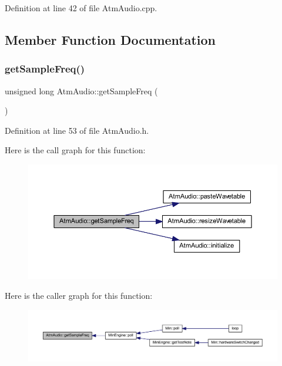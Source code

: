 Definition at line 42 of file Atm\+Audio.\+cpp.



\subsection{Member Function Documentation}
\mbox{\label{class_atm_audio_a9336911a6a8dd22d4030b0457270c242}} 
\subsubsection{\texorpdfstring{get\+Sample\+Freq()}{getSampleFreq()}}
{\footnotesize\ttfamily unsigned long Atm\+Audio\+::get\+Sample\+Freq (\begin{DoxyParamCaption}{ }\end{DoxyParamCaption})\hspace{0.3cm}{\ttfamily [inline]}}



Definition at line 53 of file Atm\+Audio.\+h.

Here is the call graph for this function\+:
\nopagebreak
\begin{figure}[H]
\begin{center}
\leavevmode
\includegraphics[width=350pt]{class_atm_audio_a9336911a6a8dd22d4030b0457270c242_cgraph}
\end{center}
\end{figure}
Here is the caller graph for this function\+:
\nopagebreak
\begin{figure}[H]
\begin{center}
\leavevmode
\includegraphics[width=350pt]{class_atm_audio_a9336911a6a8dd22d4030b0457270c242_icgraph}
\end{center}
\end{figure}
\mbox{\label{class_atm_audio_ada27d4d2556b8b27f4c3c8b4da763176}} 
